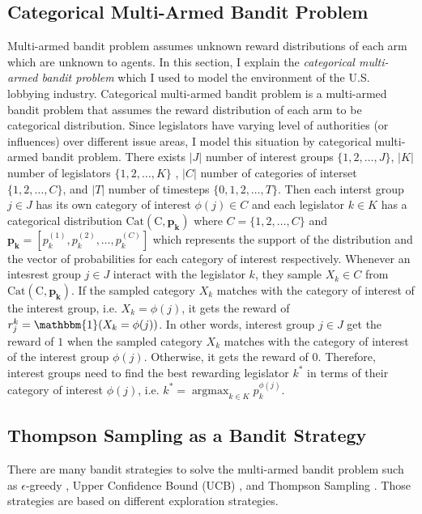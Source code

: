 \documentclass{article}
\begin{document}
\subsection{\large{ 
Categorical Multi-Armed Bandit Problem}} \label{vanilla}

Multi-armed bandit problem 
assumes unknown reward distributions 
of each arm
which are unknown to agents.
In this section, I explain 
the \textit{categorical multi-armed bandit problem}\label{categorical}
which I used to model the 
environment of the U.S. lobbying industry.
Categorical multi-armed bandit problem
is a multi-armed bandit problem
that assumes the reward distribution of each arm to be categorical distribution.
Since legislators have varying level of authorities (or influences) 
over different issue areas,
I model this situation by categorical multi-armed bandit problem. There exists $|J|$ number of interest groups 
$\{1, 2, \hdots, J\}$, $|K|$ number of legislators $\{1, 2, \hdots, K\}$ 
, $|C|$ number of categories of interset $\{1,2, \hdots, C\}$, and
$|T|$ number of timesteps $\{0, 1, 2, \hdots, T\}$.  
Then each interst group $j \in J$ has its 
own category of interest $\phi(j) \in C$ and
each legislator $k \in K$ has a categorical distribution 
$\operatorname{Cat(C, \mathbf{p_k})}$ where
$C=\{1,2,\hdots, C\}$ and $\mathbf{p_k} = [p_k^{(1)}, p_k^{(2)}, \hdots, p_k^{(C)}]$
which represents the support of the distribution
and the vector of probabilities for each category of interest respectively.
Whenever an intesrest group $j \in J$ interact with the legislator $k$, they
sample $X_k \in C$ from $\operatorname{Cat(C, \mathbf{p_k})}$.
If the sampled category $X_k$ matches with the category of interest of the interest group, i.e. 
$X_k = \phi(j)$,
it gets the reward of $r_j^k = \mathbbm{1}(X_{k} = \phi(j))$. 
In other words, 
interest group $j \in J$
get the reward of $1$
when the sampled category $X_k$ matches with the category of interest of the interest group $\phi(j)$.
Otherwise, it gets the reward of $0$.
Therefore, interest groups 
need to find the best rewarding 
legislator $k^*$ in terms of their category of interest $\phi(j)$, i.e. 
$k^* = \operatorname{argmax}_{k \in K} p_k^{\phi(j)}$.


\subsection{\large{Thompson Sampling as a Bandit Strategy}}
There are many bandit strategies to solve the multi-armed bandit problem
such as $\epsilon$-greedy \citep{egrdy}, Upper Confidence Bound (UCB) \citep{ucb}, and Thompson Sampling \citep{tom}.
Those strategies are based on different exploration strategies.
\end{document}
